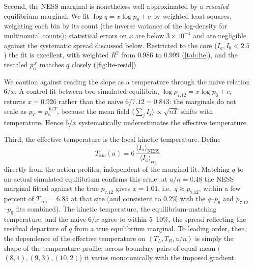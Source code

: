 \documentclass[11pt,a4paper]{article}
\theoremstyle{definition}
\numberwithin{equation}{section}   %
\begin{document}
Second, the NESS marginal is nonetheless well approximated by a
\emph{rescaled} equilibrium marginal. We fit $\log q = x\log p_6 + c$ by
weighted least squares, weighting each bin by its count (the inverse variance
of the log-density for multinomial counts); statistical errors on $x$ are
below $3\times10^{-4}$ and are negligible against the systematic spread
discussed below. Restricted to the core ($I_a,I_b<2.5$) the fit is excellent,
with weighted $R^2$ from $0.986$ to $0.999$ (\cref{tab:lte}), and the rescaled
$p_6^{\,x}$ matches $q$ closely (\cref{fig:lte-resid}).

We caution against reading the slope as a temperature through the naive
relation $6/x$. A control fit between two simulated equilibria,
$\log p_{7.12}=x\log p_6+c$, returns $x=0.926$ rather than the naive
$6/7.12=0.843$: the marginals do not scale as $p_T=p_6^{\,6/T}$,
because the mean field $\langle\sum_j I_j\rangle\propto\sqrt{nT}$ shifts with
temperature. Hence $6/x$ systematically underestimates the effective
temperature.

Third, the effective temperature is the local kinetic temperature. Define
\[
  T_{\mathrm{kin}}(a)=
  6\,\frac{\langle I_a\rangle_{\mathrm{NESS}}}
          {\langle I_a\rangle_{\mathrm{eq}}}
\]
directly from the action profiles, independent of the marginal fit. Matching
$q$ to an actual simulated equilibrium confirms
this scale: at $a/n=0.48$ the NESS marginal fitted against the true $p_{7.12}$
gives $x=1.01$, i.e.\ $q\approx p_{7.12}$, within a few percent of
$T_{\mathrm{kin}}=6.85$ at that site (and consistent to $0.2\%$ with the
$q$--$p_6$ and $p_{7.12}$--$p_6$ fits combined). The kinetic temperature, the
equilibrium-matching temperature, and the naive $6/x$ agree to within
$5$--$10\%$, the spread reflecting the residual departure of $q$ from a true
equilibrium marginal. To leading order, then, the dependence of the effective
temperature on $(T_L,T_R,a/n)$ is simply the shape of the temperature profile;
across boundary pairs of equal mean ($(8,4),(9,3),(10,2)$) it varies
monotonically with the imposed gradient.
\end{document}
